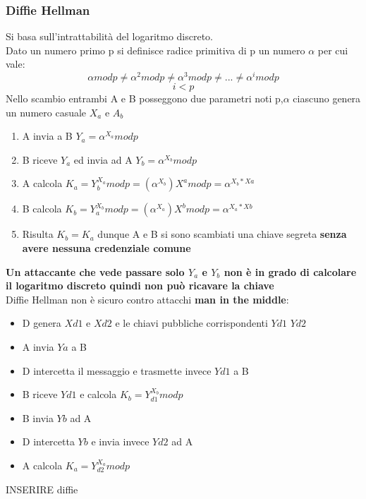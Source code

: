 \documentclass[12pt]{article}
\begin{document}
		\subsubsection{Diffie Hellman}
			Si basa sull'intrattabilità del logaritmo discreto.\\
			Dato un numero primo p si definisce radice primitiva di p un numero $\alpha$ per cui vale:
			$$\alpha modp \neq \alpha^{2} modp \neq \alpha^{3} modp \neq ... \neq \alpha^{i} modp  $$
			$$i<p $$
			Nello scambio entrambi A e B posseggono due parametri noti p,$\alpha$ ciascuno genera un numero casuale $X_{a}$ e $A_{b}$
			\begin{enumerate}
				\item A invia a B $Y_{a}= \alpha^{X_{a}} modp$
				\item B riceve $Y_{a}$ ed invia ad A $Y_{b}=\alpha^{X_{b}}modp$
				\item A calcola $K_{a} = Y_{b}^{X_{a}}modp = (\alpha^{X_{b}})X^{a}modp= \alpha^{X_{b}*X{a}}$
				\item B calcola $K_{b} = Y_{a}^{X_{b}}modp = (\alpha^{X_{a}})X^{b}modp= \alpha^{X_{a}*X{b}}$
				\item Risulta $K_{b} = K_{a}$ dunque A e B si sono scambiati una chiave segreta \textbf{senza avere nessuna credenziale comune}
 			\end{enumerate}	
 			\textbf{Un attaccante che vede passare solo $Y_{a}$ e $Y_{b}$ non è in grado di calcolare il logaritmo discreto quindi non può ricavare la chiave}\\
 			Diffie Hellman non è sicuro contro attacchi \textbf{man in the middle}:
 			\begin{itemize}
 				\item D genera $X{d1}$ e $X{d2}$ e le chiavi pubbliche corrispondenti $Y{d1}$ $Y{d2}$
 				\item A invia $Y{a}$ a B
 				\item D intercetta il messaggio e trasmette invece $Y{d1}$ a B
 				\item B riceve $Y{d1}$ e calcola $K_{b}= Y_{d1}^{X_{b}}modp$
 				\item B invia $Y{b}$ ad A
 				\item D intercetta $Y{b}$ e invia invece $Y{d2}$ ad A
 				\item A calcola $K_{a}= Y_{d2}^{X_{a}}modp$
 			\end{itemize}
 			
 			INSERIRE diffie\\
 			
\end{document}
